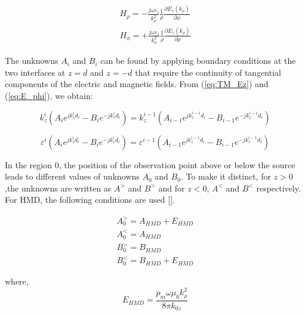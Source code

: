 \documentclass{article}
\begin{document}
  \begin{subequations}
    \begin{align}
      H_{\rho} = -\frac{j\omega \varepsilon_i}{k_{\rho}^2} \frac{1}{\rho}\frac{\partial E_z(k_\rho)}{\partial \phi}
      \label{eq:H_rho} \\
      H_{\phi} =  +\frac{j\omega \varepsilon_i}{k_{\rho}^2} \frac{1}{\rho} \frac{\partial E_z(k_\rho)}{\partial \rho}
      \label{eq:H_phi}
    \end{align}
    \label{eq:H_fields}
  \end{subequations}

  The unknowns $A_i$ and $B_i$ can be found by applying boundary conditions at the two interfaces at $z = d$ and $z=-d$ that require the continuity of tangential components of the electric and magnetic fields. From (\ref{eq:TM_Ez}) and (\ref{eq:E_phi}), we obtain:

  \begin{equation}
    k_z^i \left( A_i e^{jk_z^i d_i} - B_i e^{-jk_z^i d_i}  \right) = k_z^{i-1} \left( A_{i-1} e^{jk_z^{i-1} d_i} - B_{i-1} e^{-jk_z^{i-1} d_i}  \right)
    \label{eq:E_rho_BC}
  \end{equation}

  \begin{equation}
    \varepsilon^i \left( A_i e^{jk_z^i d_i} - B_i e^{-jk_z^i d_i}  \right) = \varepsilon^{i-1} \left( A_{i-1} e^{jk_z^{i-1} d_i} - B_{i-1} e^{-jk_z^{i-1} d_i}  \right)
    \label{eq:H_rho_BC}
  \end{equation}

  In the region 0, the position of the observation point above or below the source leads to different values of unknowns $A_0$ and $B_0$. To make it distinct, for $z>0$,the unknowns are written as $A^>$ and $B^>$ and for $z<0$, $A^<$ and $B^<$ respectively. For HMD, the following conditions are used [\cite{kong1990electromagnetic}].

  \begin{subequations}
    \begin{align}
      A_0^> = A_{HMD} + E_{HMD} \\
      A_0^< = A_{HMD}
      \label{eq:A_0} \\
      B_0^> = B_{HMD} \\
      B_0^< = B_{HMD} + E_{HMD}
      \label{eq:B_0}
    \end{align}
    \label{eq:HMD}
  \end{subequations}

  where,
  \begin{equation}
    E_{HMD} = \frac{p_m \omega \mu_0 k_{\rho}^2}{8 \pi k_{0z}}
    \label{eq:E_HMD}
  \end{equation}
\end{document}
